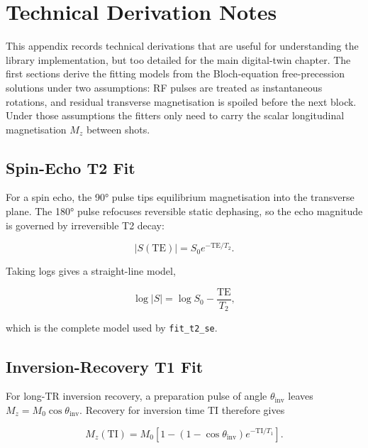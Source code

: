 \doublespacing %

\chapter{Technical Derivation Notes}
\label{app:fit-model-derivations}

\thesisspacing %

This appendix records technical derivations that are useful for
understanding the library implementation, but too detailed for the main
digital-twin chapter. The first sections derive the fitting models from
the Bloch-equation free-precession solutions under two assumptions: RF
pulses are treated as instantaneous rotations, and residual transverse
magnetisation is spoiled before the next block. Under those assumptions
the fitters only need to carry the scalar longitudinal magnetisation
\(M_z\) between shots.

\section{Spin-Echo T2 Fit}

For a spin echo, the 90° pulse tips equilibrium magnetisation into the
transverse plane. The 180° pulse refocuses reversible static dephasing,
so the echo magnitude is governed by irreversible T2 decay:

\begin{equation}
    |S(\mathrm{TE})| = S_0 e^{-\mathrm{TE}/T_2}.
\end{equation}

Taking logs gives a straight-line model,

\begin{equation}
    \log |S| = \log S_0 - \frac{\mathrm{TE}}{T_2},
\end{equation}

which is the complete model used by \texttt{fit\_t2\_se}.

\section{Inversion-Recovery T1 Fit}

For long-TR inversion recovery, a preparation pulse of angle
\(\theta_{\mathrm{inv}}\) leaves
\(M_z = M_0\cos\theta_{\mathrm{inv}}\). Recovery for inversion time TI
therefore gives

\begin{equation}
    M_z(\mathrm{TI}) =
    M_0\left[
        1 -
        \left(1 - \cos\theta_{\mathrm{inv}}\right)
        e^{-\mathrm{TI}/T_1}
    \right].
\end{equation}


